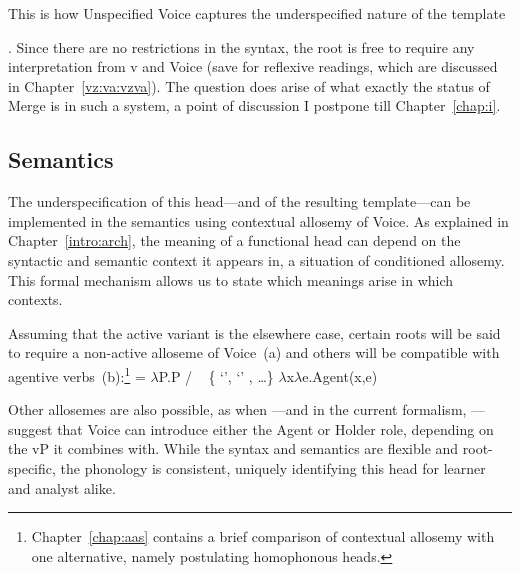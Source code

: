 This is how Unspecified Voice captures the underspecified nature of the template {\tkal. Since there are no restrictions in the syntax, the root is free to require any interpretation from v and Voice (save for reflexive readings, which are discussed in Chapter~\ref{vz:va:vzva}). The question does arise of what exactly the status of Merge is in such a system, a point of discussion I postpone till Chapter~\ref{chap:i}.

		
		\subsection{Semantics} \label{voice:voice:sem}
The underspecification of this head---and of the resulting template---can be implemented in the semantics using contextual allosemy of Voice. As explained in Chapter~\ref{intro:arch}, the meaning of a functional head can depend on the syntactic and semantic context it appears in, a situation of conditioned allosemy. This formal mechanism allows us to state which meanings arise in which contexts.

Assuming that the active variant is the elsewhere case, certain roots will be said to require a non-active alloseme of Voice~(\nextx a) and others will be compatible with agentive verbs~(\nextx b):\footnote{Chapter~\ref{chap:aas} contains a brief comparison of contextual allosemy with one alternative, namely postulating homophonous heads.}
\pex {} = 
	\a $\lambda$P.P \phantom{agent(x,e)xxx} / \trace~ \{  `',  `' , \dots \}
	\a $\lambda$x$\lambda$e.Agent(x,e)
\xe

Other allosemes are also possible, as when \cite{kratzer96}---and in the current formalism, \cite{woodmarantz17}---suggest that Voice can introduce either the Agent or Holder role, depending on the vP it combines with. While the syntax and semantics are flexible and root-specific, the phonology is consistent, uniquely identifying this head for learner and analyst alike.
		
}
